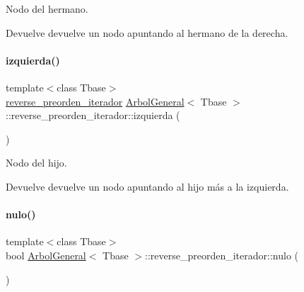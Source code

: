 Nodo del hermano. 

\begin{DoxyReturn}{Devuelve}
devuelve un nodo apuntando al hermano de la derecha. 
\end{DoxyReturn}
\hypertarget{classArbolGeneral_1_1reverse__preorden__iterador_a330e28fcf945bdd4034706be1bc7261a}{}\label{classArbolGeneral_1_1reverse__preorden__iterador_a330e28fcf945bdd4034706be1bc7261a} 
\paragraph{\texorpdfstring{izquierda()}{izquierda()}}
{\footnotesize\ttfamily template$<$class Tbase$>$ \\
\hyperlink{classArbolGeneral_1_1reverse__preorden__iterador}{reverse\+\_\+preorden\+\_\+iterador} \hyperlink{classArbolGeneral}{Arbol\+General}$<$ Tbase $>$\+::reverse\+\_\+preorden\+\_\+iterador\+::izquierda (\begin{DoxyParamCaption}{ }\end{DoxyParamCaption})\hspace{0.3cm}{\ttfamily [inline]}}



Nodo del hijo. 

\begin{DoxyReturn}{Devuelve}
devuelve un nodo apuntando al hijo más a la izquierda. 
\end{DoxyReturn}
\hypertarget{classArbolGeneral_1_1reverse__preorden__iterador_ae2f6fe815da3cd60b18623dc519166c3}{}\label{classArbolGeneral_1_1reverse__preorden__iterador_ae2f6fe815da3cd60b18623dc519166c3} 
\paragraph{\texorpdfstring{nulo()}{nulo()}}
{\footnotesize\ttfamily template$<$class Tbase$>$ \\
bool \hyperlink{classArbolGeneral}{Arbol\+General}$<$ Tbase $>$\+::reverse\+\_\+preorden\+\_\+iterador\+::nulo (\begin{DoxyParamCaption}{ }\end{DoxyParamCaption})\hspace{0.3cm}{\ttfamily [inline]}}



